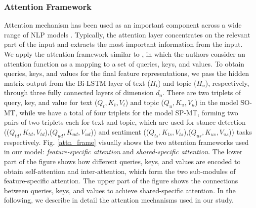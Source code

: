 \documentclass[letterpaper]{article} %
\begin{document}
 
\subsubsection{Attention Framework} \label{attn_section}
Attention mechanism has been used as an important component across a wide range of NLP models \cite{bahdanau2014neural}. Typically, the attention layer concentrates on the relevant part of the input and extracts the most important information from the input. We apply the attention framework similar to \cite{vaswani2017attention}, in which the authors consider an attention function as a mapping to a set of queries, keys, and values. To obtain queries, keys, and values for the final feature representations, we pass the hidden matrix output from the Bi-LSTM layer of text ($H_t$) and topic ($H_u$), respectively, through three fully connected layers of dimension $d_a$. There are two triplets of query, key, and value for text ($Q_t,K_t,V_t$) and topic ($Q_u,K_u,V_u$) in the model SO-MT, while we have a total of four triplets for the model SP-MT, forming two pairs of two triplets each for text and topic, which are used for stance detection (($Q_{td},K_{td},V_{td}$),($Q_{ud},K_{ud},V_{ud}$)) and sentiment (($Q_{ts},K_{ts},V_{ts}$),($Q_{us},K_{us},V_{us}$)) tasks respectively. Fig. \ref{attn_frame} visually shows the two attention frameworks used in our model: \textit{feature-specific attention} and \textit{shared-specific attention}. The lower part of the figure shows how different queries, keys, and values are encoded to obtain self-attention and inter-attention, which form the two sub-modules of feature-specific attention. The upper part of the figure shows the connections between queries, keys, and values to achieve shared-specific attention. In the following, we describe in detail the attention mechanisms used in our study.
\end{document}
